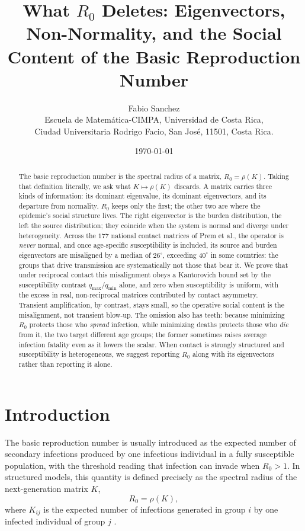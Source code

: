 \documentclass[12pt]{article}
\title{What \texorpdfstring{$R_0$}{R0} Deletes:
Eigenvectors, Non-Normality, and the Social Content
of the Basic Reproduction Number}
\author{%
Fabio Sanchez\\[3pt]
  {\small Escuela de Matemática-CIMPA, Universidad de Costa Rica,}\\
  {\small Ciudad Universitaria Rodrigo Facio, San José, 11501, Costa Rica.}
}
\date{\today}
\begin{document}
\maketitle

\begin{abstract}
The basic reproduction number is the spectral radius of a matrix, $R_0=\rho(K)$. Taking that definition literally, we ask what $K\mapsto\rho(K)$ discards. A matrix carries three kinds of information: its dominant eigenvalue, its dominant eigenvectors, and its departure from normality. $R_0$ keeps only the first; the other two are where the epidemic's social structure lives. The right eigenvector is the burden distribution, the left the source distribution; they coincide when the system is normal and diverge under heterogeneity. Across the $177$ national contact matrices of Prem et al., the operator is \emph{never} normal, and once age-specific susceptibility is included, its source and burden eigenvectors are misaligned by a median of $26^{\circ}$, exceeding $40^{\circ}$ in some countries: the groups that drive transmission are systematically not those that bear it. We prove that under reciprocal contact this misalignment obeys a Kantorovich bound set by the susceptibility contrast $q_{\max}/q_{\min}$ alone, and zero when susceptibility is uniform, with the excess in real, non-reciprocal matrices contributed by contact asymmetry. Transient amplification, by contrast, stays small, so the operative social content is the misalignment, not transient blow-up. The omission also has teeth: because minimizing $R_0$ protects those who \emph{spread} infection, while minimizing deaths protects those who \emph{die} from it, the two target different age groups; the former sometimes raises average infection fatality even as it lowers the scalar. When contact is strongly structured and susceptibility is heterogeneous, we suggest reporting $R_0$ along with its eigenvectors rather than reporting it alone.
\end{abstract}


\section{Introduction}

The basic reproduction number is usually introduced as the expected number of secondary infections produced by one infectious individual in a fully susceptible population, with the threshold reading that infection can invade when $R_0>1$. In
structured models, this quantity is defined precisely as the spectral radius of the next-generation matrix $K$,
\begin{equation}
R_0=\rho(K),
\end{equation}
where $K_{ij}$ is the expected number of infections generated in group $i$ by one infected individual of group $j$ \cite{diekmann2010,vandendriessche2002}.
\end{document}
